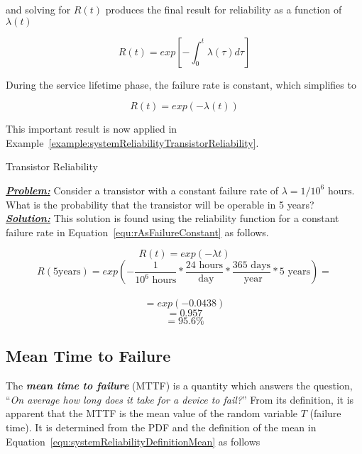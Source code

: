 {and solving for $R(t)$ produces the final result for reliability as
a function of $\lambda(t)$ 

\begin{equation}
\label{equ:rAsFunctionOfLambda}
R(t) = exp [ - \int^t_0\lambda(\tau) d\tau ]
\end{equation}

During the service lifetime phase, the failure rate is constant, which
simplifies to

\begin{equation}
\label{equ:rAsFailureConstant}
R(t) = exp (- \lambda(t))
\end{equation}

This important result is now applied in 
Example~\ref{example:systemReliabilityTransistorReliability}.

\begin{example}{Transistor Reliability}
\label{example:systemReliabilityTransistorReliability}

\emph{\textbf{\ul{Problem:}}} Consider a transistor with a constant
failure rate of $\lambda = 1/10^6 \text{ hours}$. What is the
probability that the transistor will be operable in 5 years? \\

\emph{\textbf{\ul{Solution:}}} This solution is found using the
reliability function for a constant failure rate in 
Equation~\ref{equ:rAsFailureConstant} as follows.

$$R(t) = exp(-\lambda t)  $$
$$R(5 \text{years}) = exp( - \frac{1}{10^6 \text{ hours}} * \frac{24 \text{ hours}}{\text{ day}} * \frac{365 \text{ days}}{\text{ year}} * 5 \text{ years} ) = $$\\
$$			= exp(-0.0438) $$ 
$$			= 0.957 $$
$$			= 95.6 \% $$
\end{example}

\subsection{Mean Time to Failure}
\label{subsection:mean-time-to-failure}

The \emph{\textbf{mean time to failure}} (MTTF) is a quantity which
answers the question, ``\emph{On average how long does it take for a
device to fail?}'' From its definition, it is apparent that the MTTF is
the mean value of the random variable $T$ (failure time). It is
determined from the PDF and the definition of the mean in 
Equation~\ref{equ:systemReliabilityDefinitionMean} as follows

}
